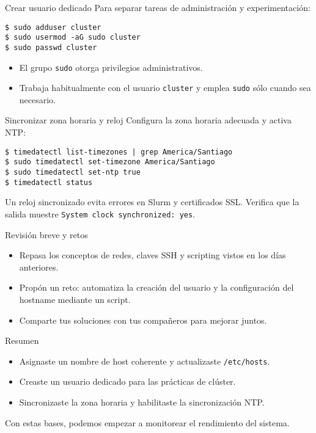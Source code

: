 \documentclass[aspectratio=169,professionalfonts]{beamer}
\begin{document}
\begin{frame}[fragile]{Crear usuario dedicado}
  Para separar tareas de administración y experimentación:
  \begin{verbatim}
$ sudo adduser cluster
$ sudo usermod -aG sudo cluster
$ sudo passwd cluster
  \end{verbatim}
  \begin{itemize}
    \item El grupo \texttt{sudo} otorga privilegios administrativos.
    \item Trabaja habitualmente con el usuario \texttt{cluster} y emplea \texttt{sudo} sólo cuando sea necesario.
  \end{itemize}
\end{frame}

\begin{frame}[fragile]{Sincronizar zona horaria y reloj}
  Configura la zona horaria adecuada y activa NTP:
  \begin{verbatim}
$ timedatectl list-timezones | grep America/Santiago
$ sudo timedatectl set-timezone America/Santiago
$ sudo timedatectl set-ntp true
$ timedatectl status
  \end{verbatim}
  \begin{infobox}
  Un reloj sincronizado evita errores en Slurm y certificados SSL. Verifica que la salida muestre \texttt{System clock synchronized: yes}.
  \end{infobox}
\end{frame}

\begin{frame}[fragile]{Revisión breve y retos}
  \begin{itemize}
    \item Repasa los conceptos de redes, claves SSH y scripting vistos en los días anteriores.
    \item Propón un reto: automatiza la creación del usuario y la configuración del hostname mediante un script.
    \item Comparte tus soluciones con tus compañeros para mejorar juntos.
  \end{itemize}
\end{frame}

\begin{frame}[fragile]{Resumen}
  \begin{itemize}
    \item Asignaste un nombre de host coherente y actualizaste \texttt{/etc/hosts}.
    \item Creaste un usuario dedicado para las prácticas de clúster.
    \item Sincronizaste la zona horaria y habilitaste la sincronización NTP.
  \end{itemize}
  \vspace{0.5em}
  Con estas bases, podemos empezar a monitorear el rendimiento del sistema.
\end{frame}
\end{document}
